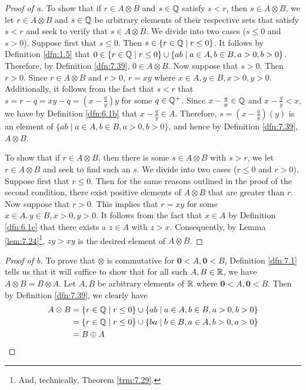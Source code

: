 \documentclass[../main.tex]{subfiles}
\begin{document}
\begin{exercise}
\begin{proof}[Proof of a]
        To show that if $r\in A\otimes B$ and $s\in\mathbb{Q}$ satisfy $s<r$, then $s\in A\otimes B$, we let $r\in A\otimes B$ and $s\in\mathbb{Q}$ be arbitrary elements of their respective sets that satisfy $s<r$ and seek to verify that $s\in A\otimes B$. We divide into two cases ($s\leq 0$ and $s>0$). Suppose first that $s\leq 0$. Then $s\in\{r\in\mathbb{Q}\mid r\leq 0\}$. It follows by Definition \ref{dfn:1.5} that $0\in\{r\in\mathbb{Q}\mid r\leq 0\}\cup\{ab\mid a\in A,b\in B,a>0,b>0\}$. Therefore, by Definition \ref{dfn:7.39}, $0\in A\otimes B$. Now suppose that $s>0$. Then $r>0$. Since $r\in A\otimes B$ and $r>0$, $r=xy$ where $x\in A,y\in B,x>0,y>0$. Additionally, it follows from the fact that $s<r$ that $s=r-q=xy-q=(x-\frac{q}{y})y$ for some $q\in\mathbb{Q}^+$. Since $x-\frac{q}{y}\in\mathbb{Q}$ and $x-\frac{q}{y}<x$, we have by Definition \ref{dfn:6.1b} that $x-\frac{q}{y}\in A$. Therefore, $s=(x-\frac{q}{y})(y)$ is an element of $\{ab\mid a\in A,b\in B,a>0,b>0\}$, and hence by Definition \ref{dfn:7.39}, $A\otimes B$.\par
        To show that if $r\in A\otimes B$, then there is some $s\in A\otimes B$ with $s>r$, we let $r\in A\otimes B$ and seek to find such an $s$. We divide into two cases ($r\leq 0$ and $r>0$). Suppose first that $r\leq 0$. Then for the same reasons outlined in the proof of the second condition, there exist positive elements of $A\otimes B$ that are greater than $r$. Now suppose that $r>0$. This implies that $r=xy$ for some $x\in A,y\in B,x>0,y>0$. It follows from the fact that $x\in A$ by Definition \ref{dfn:6.1c} that there exists a $z\in A$ with $z>x$. Consequently, by Lemma \ref{lem:7.24}\footnote{And, technically, Theorem \ref{trm:7.29}.}, $zy>xy$ is the desired element of $A\otimes B$.
    \end{proof}
    \begin{proof}[Proof of b]
        To prove that $\otimes$ is commutative for $\bm{0}<A,\bm{0}<B$, Definition \ref{dfn:7.1} tells us that it will suffice to show that for all such $A,B\in\mathbb{R}$, we have $A\otimes B=B\otimes A$. Let $A,B$ be arbitrary elements of $\mathbb{R}$ where $\bm{0}<A,\bm{0}<B$. Then by Definition \ref{dfn:7.39}, we clearly have
        \begin{align*}
            A\otimes B &= \{r\in\mathbb{Q}\mid r\leq 0\}\cup\{ab\mid a\in A,b\in B,a>0,b>0\}\\
            &= \{r\in\mathbb{Q}\mid r\leq 0\}\cup\{ba\mid b\in B,a\in A,b>0,a>0\}\\
            &= B\oplus A
        \end{align*}

\end{proof}
\end{exercise}
\end{document}
